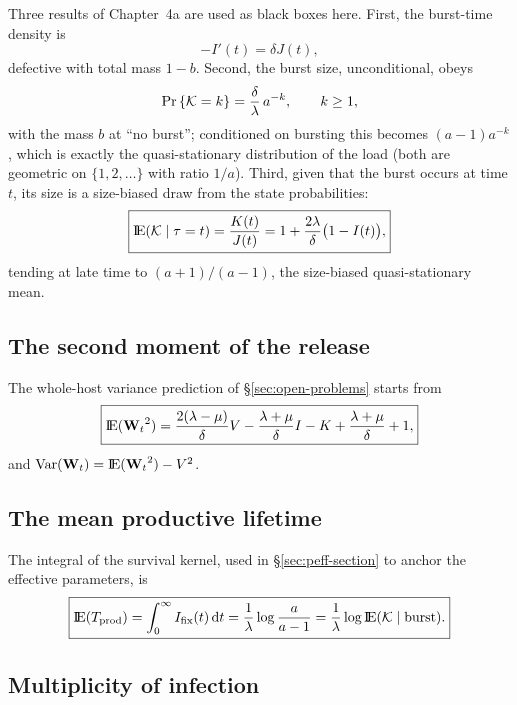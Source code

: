 Three results of Chapter~4a are used as black boxes here. First, the
burst-time density is
\begin{equation}
-I'(t)=\delta J(t),
\label{eq:phi}
\end{equation}
defective with total mass $1-b$. Second, the burst size, unconditional,
obeys
\begin{equation}
{\text{Pr}\left\{\mathcal{K}=k\right\}}=\frac{\delta}{\lambda}\,a^{-k},\qquad k\ge1,
\label{eq:burstlaw}
\end{equation}
with the mass $b$ at ``no burst''; conditioned on bursting this becomes
$(a-1)a^{-k}$, which is exactly the quasi-stationary distribution of the
load (both are geometric on $\{1,2,\ldots\}$ with ratio $1/a$). Third,
given that the burst occurs at time $t$, its size is a size-biased draw
from the state probabilities:
\begin{equation}
\boxed{{\rm I}\!{\rm E}(\mathcal{K}\mid\tau=t)=\frac{K(t)}{J(t)}
=1+\frac{2\lambda}{\delta}\bigl(1-I(t)\bigr),}
\label{eq:sizebias}
\end{equation}
tending at late time to $(a+1)/(a-1)$, the size-biased quasi-stationary
mean.

\subsection{The second moment of the release}

The whole-host variance prediction of \S\ref{sec:open-problems} starts from
\begin{equation}
\boxed{{\rm I}\!{\rm E}({{\bf W}_t}^2)
=\frac{2(\lambda-\mu)}{\delta}V
-\frac{\lambda+\mu}{\delta}I
-K
+\frac{\lambda+\mu}{\delta}
+1,}
\label{eq:EW2}
\end{equation}
and $\mathrm{Var}({{\bf W}_t})={\rm I}\!{\rm E}({{\bf W}_t}^2)-V^2$.

\subsection{The mean productive lifetime}

The integral of the survival kernel, used in \S\ref{sec:peff-section} to
anchor the effective parameters, is
\begin{equation}
\boxed{{\rm I}\!{\rm E}(T_{\rm prod})=\int_0^\infty I_{\mathrm{fix}}(t)\,{\rm d} t
=\frac{1}{\lambda}\log\frac{a}{a-1}
=\frac{1}{\lambda}\log{\rm I}\!{\rm E}(\mathcal{K}\mid\text{burst}).}
\label{prop:lifetime}
\end{equation}

\subsection{Multiplicity of infection}

